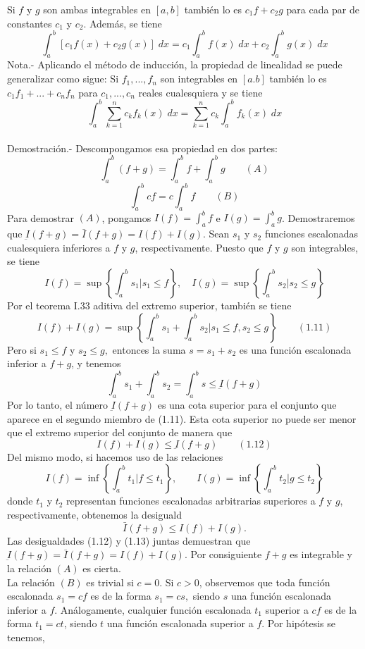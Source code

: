 \begin{teo} Si $f$ y $g$ son ambas integrables en $[a,b]$ también lo es $c_1f+c_2g$ para cada par de constantes $c_1$ y $c_2$. Además, se tiene
    $$\int_a^b \left[c_1 f(x) + c_2g(x)\right]\; dx = c_1\int_a^b f(x) \; dx + c_2 \int_a^b g(x) \; dx$$
    Nota.- \; Aplicando el método de inducción, la propiedad de linealidad se puede generalizar como sigue: Si $f_1,...,f_n$ son integrables en $[a.b]$ también lo es $c_1f_1+...+c_nf_n$ para $c_1,...,c_n$ reales cualesquiera y se tiene $$\int_a^b \sum\limits_{k=1}^n c_kf_k(x)\; dx = \sum\limits_{k=1}^n c_k \int_a^b f_k(x)\; dx$$\\

    Demostración.-\; Descompongamos esa propiedad en dos partes:
    $$\int_a^b (f+g) = \int_a^b f + \int_a^b g \qquad (A)$$
    $$\int_a^b cf = c \int_a^b f \qquad (B)$$
    Para demostrar $(A)$, pongamos $I(f) = \int_a^b f$ e $I(g) = \int_a^b g$. Demostraremos que $\underbar{I}(f+g) = \bar{I}(f+g) = I(f) + I(g).$
    Sean $s_1$ y $s_2$ funciones escalonadas cualesquiera inferiores a $f$ y $g$, respectivamente. Puesto que $f$ y $g$ son integrables, se tiene $$I(f) = \sup\left\{ \int_a^b s_1 | s_1 \leq f \right\}, \quad I(g) =\sup\left\{ \int_a^b s_2 | s_2 \leq g\right\}$$
    Por el teorema I.33 aditiva del extremo superior, también se tiene $$I(f) + I(g) = \sup\left\{\int_a^b s_1 + \int_a^b s_2 | s_1 \leq f, s_2\leq g\right\} \qquad (1.11)$$
    Pero si $s_1\leq f$ y $s_2 \leq g,$ entonces la suma $s=s_1+s_2$ es una función escalonada inferior a $f+g$, y tenemos 
    $$\int_a^b s_1 + \int_a^b s_2 = \int_a^b s \leq \underbar{I}(f+g)$$
    Por lo tanto, el número $\underbar{I}(f+g)$ es una cota superior para el conjunto que aparece en el segundo miembro de (1.11). Esta cota superior no puede ser menor que el extremo superior del conjunto de manera que $$I(f) + I(g) \leq \underbar{I}(f+g) \qquad (1.12)$$ 
    Del mismo modo, si hacemos uso de las relaciones 
    $$I(f) = \inf\left\{\int_a^b t_1 | f\leq t_1\right\}, \qquad I(g)= \inf\left\{\int_a^b t_2 | g\leq t_2\right\}$$
    donde $t_1$ y $t_2$ representan funciones escalonadas arbitrarias superiores a $f$ y $g$, respectivamente, obtenemos la desiguald
    $$\bar{I}(f+g) \leq I(f) + I(g).$$
    Las desigualdades (1.12) y (1.13) juntas demuestran que $\underbar{I}(f+g) = \bar{I} (f+g) = I(f) + I(g)$. Por consiguiente $f+g$ es integrable y la relación $(A)$ es cierta.\\
    La relación $(B)$ es trivial si $c=0$. Si $c>0$, observemos que toda función escalonada $s_1=cf$ es de la forma $s_1=cs,$ siendo $s$ una función escalonada inferior a $f$. Análogamente, cualquier función escalonada $t_1$ superior a $cf$ es de la forma $t_1=ct$, siendo $t$ una función escalonada superior a $f$. Por hipótesis se tenemos, 

\end{teo}
